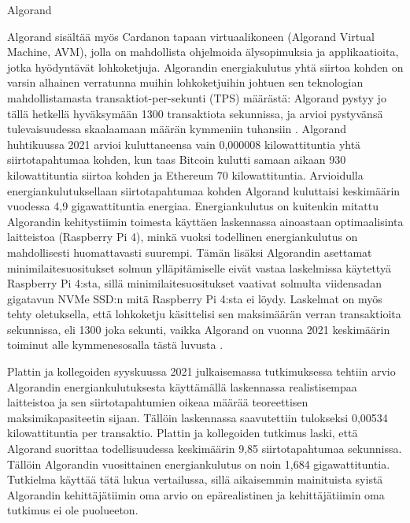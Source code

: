 \begin{subsection}{Algorand\label{algorand0}}
\begin{otherlanguage}{finnish}
Algorand sisältää myös Cardanon tapaan virtuaalikoneen (Algorand Virtual Machine, AVM), jolla on mahdollista ohjelmoida älysopimuksia ja applikaatioita, jotka hyödyntävät lohkoketjuja. Algorandin energiakulutus yhtä siirtoa kohden on varsin alhainen verratunna muihin lohkoketjuihin johtuen sen teknologian mahdollistamasta transaktiot-per-sekunti (TPS) määrästä: Algorand pystyy jo tällä hetkellä hyväksymään 1300 transaktiota sekunnissa, ja arvioi pystyvänsä tulevaisuudessa skaalaamaan määrän kymmeniin tuhansiin \cite{algorand-energy-2}. Algorand huhtikuussa 2021 arvioi kuluttaneensa vain 0,000008 kilowattituntia \cite{algorand-energy-2} yhtä siirtotapahtumaa kohden, kun taas Bitcoin kulutti samaan aikaan 930 kilowattituntia siirtoa kohden ja Ethereum 70 kilowattituntia. Arvioidulla energiankulutuksellaan siirtotapahtumaa kohden Algorand kuluttaisi keskimäärin vuodessa 4,9 gigawattituntia energiaa. Energiankulutus on kuitenkin mitattu Algorandin kehitystiimin toimesta käyttäen laskennassa ainoastaan optimaalisinta laitteistoa (Raspberry Pi 4), minkä vuoksi todellinen energiankulutus on mahdollisesti huomattavasti suurempi. Tämän lisäksi Algorandin asettamat minimilaitesuositukset solmun ylläpitämiselle eivät vastaa laskelmissa käytettyä Raspberry Pi 4:sta, sillä minimilaitesuositukset vaativat solmulta viidensadan gigatavun NVMe SSD:n \cite{algorand-min-specs} mitä Raspberry Pi 4:sta ei löydy. Laskelmat on myös tehty oletuksella, että lohkoketju käsittelisi sen maksimäärän verran transaktioita sekunnissa, eli 1300 joka sekunti, vaikka Algorand on vuonna 2021 keskimäärin toiminut alle kymmenesosalla tästä luvusta \cite{algorand-explorer}.

Plattin ja kollegoiden syyskuussa 2021 julkaisemassa tutkimuksessa \cite{algorand-energy} tehtiin arvio Algorandin energiankulutuksesta käyttämällä laskennassa realistisempaa laitteistoa ja sen siirtotapahtumien oikeaa määrää teoreettisen maksimikapasiteetin sijaan. Tällöin laskennassa saavutettiin tulokseksi 0,00534 \cite{algorand-energy} kilowattituntia per transaktio. Plattin ja kollegoiden tutkimus laski, että Algorand suorittaa todellisuudessa keskimäärin 9,85 \cite{algorand-energy} siirtotapahtumaa sekunnissa. Tällöin Algorandin vuosittainen energiankulutus on noin 1,684 gigawattituntia. Tutkielma käyttää tätä lukua vertailussa, sillä aikaisemmin mainituista syistä Algorandin kehittäjätiimin oma arvio on epärealistinen ja kehittäjätiimin oma tutkimus ei ole puolueeton. 

\end{otherlanguage}
\end{subsection}